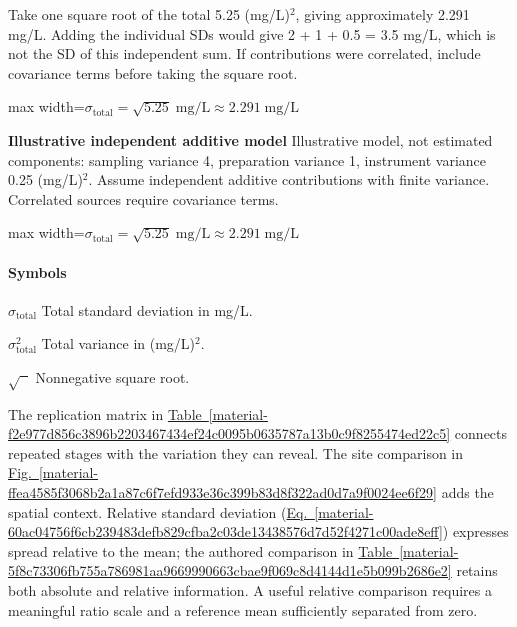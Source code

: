 \documentclass[11pt,a4paper]{article}
\begin{document}
Take one square root of the total 5.25 (mg/L)\ensuremath{{}^2}, giving approximately 2.291 mg/L.
Adding the individual SDs would give 2 + 1 + 0.5 = 3.5 mg/L, which is not the SD of this independent sum.
If contributions were correlated, include covariance terms before taking the square root.
\begin{center}\begin{adjustbox}{max width=\linewidth}$\displaystyle \sigma_{\mathrm{total}}=\sqrt{5.25}\;\mathrm{mg/L}\approx2.291\;\mathrm{mg/L}$\end{adjustbox}\end{center}

\par\textbf{Illustrative independent additive model} Illustrative model, not estimated components: sampling variance 4, preparation variance 1, instrument variance 0.25 (mg/L)\ensuremath{{}^2}. Assume independent additive contributions with finite variance. Correlated sources require covariance terms.
\begin{center}\begin{adjustbox}{max width=\linewidth}$\displaystyle \sigma_{\mathrm{total}}=\sqrt{5.25}\;\mathrm{mg/L}\approx2.291\;\mathrm{mg/L}$\end{adjustbox}\end{center}

\paragraph{Symbols}
\par\noindent\textbf{\(\sigma_{\mathrm{total}}\)} Total standard deviation in mg/L.
\par\noindent\textbf{\(\sigma_{\mathrm{total}}^2\)} Total variance in (mg/L)\ensuremath{{}^2}.
\par\noindent\textbf{\(\sqrt{\phantom{x}}\)} Nonnegative square root.
\medskip

The replication matrix in \hyperref[material-f2e977d856c3896b2203467434ef24c0095b0635787a13b0c9f8255474ed22c5]{Table~\ref*{material-f2e977d856c3896b2203467434ef24c0095b0635787a13b0c9f8255474ed22c5}} connects repeated stages with the variation they can reveal. The site comparison in \hyperref[material-ffea4585f3068b2a1a87c6f7efd933e36c399b83d8f322ad0d7a9f0024ee6f29]{Fig.~\ref*{material-ffea4585f3068b2a1a87c6f7efd933e36c399b83d8f322ad0d7a9f0024ee6f29}} adds the spatial context. Relative standard deviation (\hyperref[material-60ac04756f6cb239483defb829cfba2c03de13438576d7d52f4271c00ade8eff]{Eq.~\ref*{material-60ac04756f6cb239483defb829cfba2c03de13438576d7d52f4271c00ade8eff}}) expresses spread relative to the mean; the authored comparison in \hyperref[material-5f8c73306fb755a786981aa9669990663cbae9f069c8d4144d1e5b099b2686e2]{Table~\ref*{material-5f8c73306fb755a786981aa9669990663cbae9f069c8d4144d1e5b099b2686e2}} retains both absolute and relative information. A useful relative comparison requires a meaningful ratio scale and a reference mean sufficiently separated from zero.
\end{document}
